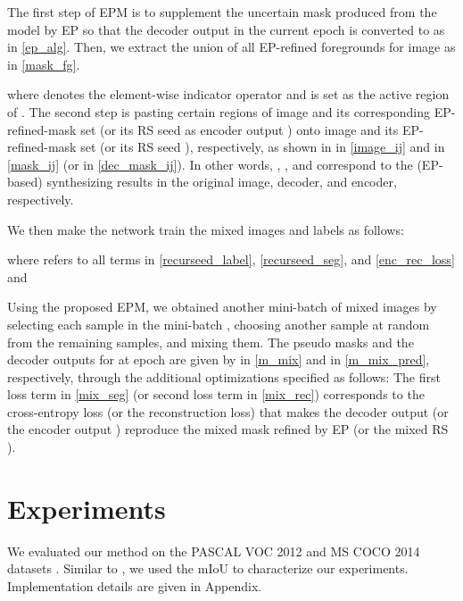 \documentclass[11pt]{article}
\begin{document}
The first step of EPM is to supplement {the uncertain mask produced from the model} by EP so that the decoder output  in the current epoch  is converted to  as in \eqref{ep_alg}. Then, we extract the union of all EP-refined foregrounds for image  as  in \eqref{mask_fg}.  
\begin{small}

\end{small}
{where  denotes the element-wise indicator operator and { is set as the active region of }.} The second step is pasting certain regions   of image  and its corresponding EP-refined-mask set  (or its RS seed as encoder output ) onto image  and its EP-refined-mask set  (or its RS seed ), respectively, as shown in  in \eqref{image_ij} and  in \eqref{mask_ij} (or  in \eqref{dec_mask_ij}). In other words, , , and  correspond to the (EP-based) synthesizing results in the original image, decoder, and encoder, respectively. 
\begin{small}

\end{small} 
We then make the network train the mixed images and labels as follows:
\begin{small}

\end{small}
where  refers to all terms in  \eqref{recurseed_label}, \eqref{recurseed_seg}, and \eqref{enc_rec_loss} and 
\begin{small} 

\end{small}
Using the proposed EPM, we obtained another mini-batch  of  mixed images by selecting each sample in the mini-batch , choosing another sample at random from the remaining samples, and mixing them. 
{The pseudo masks and the decoder outputs} for  at epoch  are given by  in \eqref{m_mix} and  in \eqref{m_mix_pred}, respectively, through the additional optimizations specified as follows: 
The first loss term in \eqref{mix_seg} (or second loss term in \eqref{mix_rec}) corresponds to {the cross-entropy loss (or the reconstruction loss) that makes the decoder output  (or the encoder output ) reproduce the mixed mask refined by EP  (or the mixed RS ).}






\section{Experiments}
\label{section:exp}

We evaluated our method on the PASCAL VOC 2012 \cite{everingham2010pascal} and MS COCO 2014 datasets \cite{lin2014microsoft}. Similar to \citet{ahn2018learning, ahn2019weakly, wang2020self, lee2021anti, 9506058}, we used the mIoU to characterize our experiments. Implementation details are given in Appendix.
\end{document}
